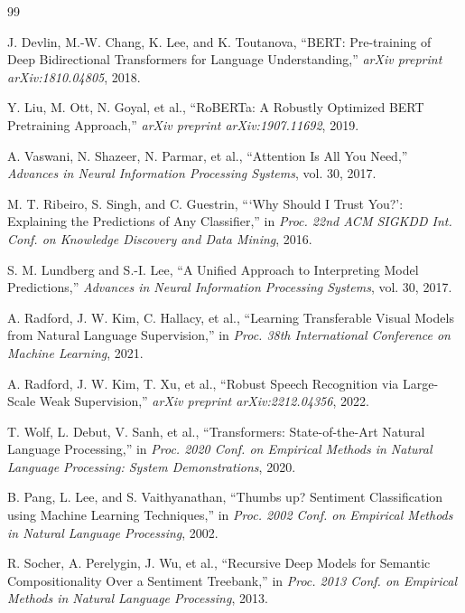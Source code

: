 \documentclass[12pt, a4paper]{report}
\begin{document}
\cleardoublepage
{}
\begin{thebibliography}{99}

J. Devlin, M.-W. Chang, K. Lee, and K. Toutanova, ``BERT: Pre-training of Deep Bidirectional Transformers for Language Understanding,'' \textit{arXiv preprint arXiv:1810.04805}, 2018.

Y. Liu, M. Ott, N. Goyal, et al., ``RoBERTa: A Robustly Optimized BERT Pretraining Approach,'' \textit{arXiv preprint arXiv:1907.11692}, 2019.

A. Vaswani, N. Shazeer, N. Parmar, et al., ``Attention Is All You Need,'' \textit{Advances in Neural Information Processing Systems}, vol. 30, 2017.

M. T. Ribeiro, S. Singh, and C. Guestrin, ```Why Should I Trust You?': Explaining the Predictions of Any Classifier,'' in \textit{Proc. 22nd ACM SIGKDD Int. Conf. on Knowledge Discovery and Data Mining}, 2016.

S. M. Lundberg and S.-I. Lee, ``A Unified Approach to Interpreting Model Predictions,'' \textit{Advances in Neural Information Processing Systems}, vol. 30, 2017.

A. Radford, J. W. Kim, C. Hallacy, et al., ``Learning Transferable Visual Models from Natural Language Supervision,'' in \textit{Proc. 38th International Conference on Machine Learning}, 2021.

A. Radford, J. W. Kim, T. Xu, et al., ``Robust Speech Recognition via Large-Scale Weak Supervision,'' \textit{arXiv preprint arXiv:2212.04356}, 2022.

T. Wolf, L. Debut, V. Sanh, et al., ``Transformers: State-of-the-Art Natural Language Processing,'' in \textit{Proc. 2020 Conf. on Empirical Methods in Natural Language Processing: System Demonstrations}, 2020.

B. Pang, L. Lee, and S. Vaithyanathan, ``Thumbs up? Sentiment Classification using Machine Learning Techniques,'' in \textit{Proc. 2002 Conf. on Empirical Methods in Natural Language Processing}, 2002.

R. Socher, A. Perelygin, J. Wu, et al., ``Recursive Deep Models for Semantic Compositionality Over a Sentiment Treebank,'' in \textit{Proc. 2013 Conf. on Empirical Methods in Natural Language Processing}, 2013.


\end{thebibliography}
\end{document}
